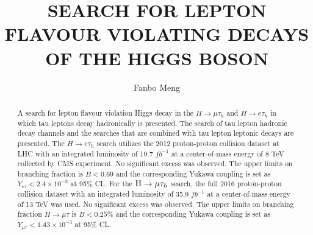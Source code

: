\documentclass[final,numrefs,sort&compress,noinfo]{nddiss2e}
\begin{document}
\frontmatter %

\title{SEARCH FOR LEPTON FLAVOUR VIOLATING DECAYS OF THE HIGGS BOSON}
\author{Fanbo Meng}
\maketitle
%
%

\makecopyright

\begin{abstract}

A search for lepton flavour violation Higgs decay in the $H \to \mu\tau_{h}$ and $H\to e\tau_{h}$ in which tau leptons decay hadronically is presented. The search of tau lepton hadronic decay channels and the searches that are combined with tau lepton leptonic decays are presented. The $H \to e \tau_{h}$ search utilizes the 2012 proton-proton collision dataset at LHC with an integrated luminosity of 19.7 $fb^{-1}$ at a center-of-mass energy of 8 TeV collected by CMS experiment. No significant excess was observed. The upper limits on branching fraction is $B<0.69$ and the corresponding Yukawa coupling is set as $Y_{e\tau}<2.4\times10^{-3}$ at 95\% CL. For the $\mathrm{H}\to \mu\tau_{h}$ search, the full 2016 proton-proton collision dataset with an integrated luminosity of 35.9 $fb^{-1}$ at a center-of-mass energy of 13 TeV was used. No significant excess was observed. The upper limits on branching fraction $H\to \mu\tau$ is $B<0.25\%$ and the corresponding Yukawa coupling is set as $Y_{\mu\tau}<1.43\times10^{-3}$ at 95\% CL. 




\end{abstract}

\end{document}
